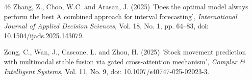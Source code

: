 \documentclass{singlecol-new}
\theoremstyle{TH}{
\newtheorem{lemma}{Lemma}
\newtheorem{theorem}[lemma]{Theorem}
\newtheorem{corrolary}[lemma]{Corrolary}
\newtheorem{conjecture}[lemma]{Conjecture}
\newtheorem{proposition}[lemma]{Proposition}
\newtheorem{claim}[lemma]{Claim}
\newtheorem{stheorem}[lemma]{Wrong Theorem}
\newtheorem{algorithm}{Algorithm}
}
\theoremstyle{THrm}{
\newtheorem{definition}{Definition}[section]
\newtheorem{question}{Question}[section]
\newtheorem{remark}{Remark}
\newtheorem{scheme}{Scheme}
}
\theoremstyle{THhit}{
\newtheorem{case}{Case}[section]
}
\begin{document}
\begin{thebibliography}{46}
Zhang, Z., Choo, W.C. and Arasan, J. (2025) 'Does the optimal model always perform the best A combined approach for interval forecasting', {\it International Journal of Applied Decision Sciences}, Vol. 18, No. 1, pp. 64--83, doi: 10.1504/ijads.2025.143079.

Zong, C., Wan, J., Cascone, L. and Zhou, H. (2025) 'Stock movement prediction with multimodal stable fusion via gated cross-attention mechanism', {\it Complex \& Intelligent Systems}, Vol. 11, No. 9, doi: 10.1007/s40747-025-02023-3.

\end{thebibliography}
\end{document}
